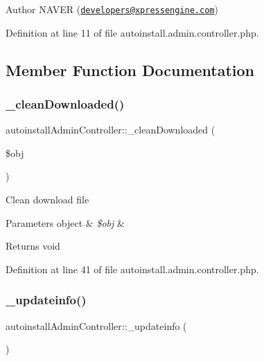 \begin{DoxyAuthor}{Author}
N\+A\+V\+ER (\href{mailto:developers@xpressengine.com}{\tt developers@xpressengine.\+com}) 
\end{DoxyAuthor}


Definition at line 11 of file autoinstall.\+admin.\+controller.\+php.



\subsection{Member Function Documentation}
\hypertarget{classautoinstallAdminController_af921268532a99f4a86c9979212279262}{}\label{classautoinstallAdminController_af921268532a99f4a86c9979212279262} 
\subsubsection{\texorpdfstring{\+\_\+clean\+Downloaded()}{\_cleanDownloaded()}}
{\footnotesize\ttfamily autoinstall\+Admin\+Controller\+::\+\_\+clean\+Downloaded (\begin{DoxyParamCaption}\item[{}]{\$obj }\end{DoxyParamCaption})}

Clean download file


\begin{DoxyParams}[1]{Parameters}
object & {\em \$obj} & \\
\hline
\end{DoxyParams}
\begin{DoxyReturn}{Returns}
void 
\end{DoxyReturn}


Definition at line 41 of file autoinstall.\+admin.\+controller.\+php.

\hypertarget{classautoinstallAdminController_ad25ac25ebf81de31754b454b758e7d20}{}\label{classautoinstallAdminController_ad25ac25ebf81de31754b454b758e7d20} 
\subsubsection{\texorpdfstring{\+\_\+updateinfo()}{\_updateinfo()}}
{\footnotesize\ttfamily autoinstall\+Admin\+Controller\+::\+\_\+updateinfo (\begin{DoxyParamCaption}{ }\end{DoxyParamCaption})}

